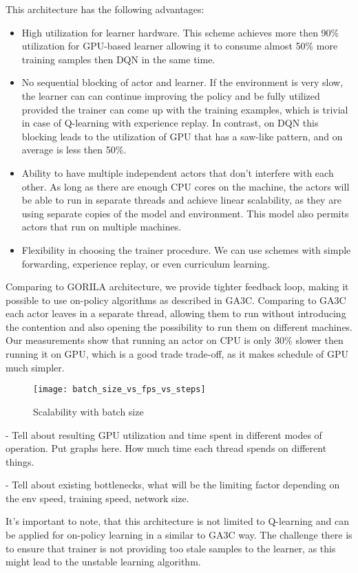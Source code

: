 This architecture has the following advantages:
\begin{itemize}
    \item High utilization for learner hardware. This scheme achieves more then 90\% utilization
        for GPU-based learner allowing it to consume almost 50\% more training samples then DQN in
        the same time.

    \item No sequential blocking of actor and learner. If the environment is very slow, the learner
        can can continue improving the policy and be fully utilized provided the trainer can come up
        with the training examples, which is trivial in case of Q-learning with experience replay.
        In contrast, on DQN this blocking leads to the utilization of GPU that has a saw-like
        pattern, and on average is less then 50\%.

    \item Ability to have multiple independent actors that don't interfere with each other. As long
        as there are enough CPU cores on the machine, the actors will be able to run in separate
        threads and achieve linear scalability, as they are using separate copies of the model and
        environment. This model also permits actors that run on multiple machines.

    \item Flexibility in choosing the trainer procedure. We can use schemes with simple forwarding,
        experience replay, or even curriculum learning.
\end{itemize}

Comparing to GORILA architecture, we provide tighter feedback loop, making it possible to use
on-policy algorithms as described in GA3C. Comparing to GA3C each actor leaves in a separate
thread, allowing them to run without introducing the contention and also opening the possibility
to run them on different machines. Our measurements show that running an actor on CPU is only 30\%
slower then running it on GPU, which is a good trade trade-off, as it makes schedule of GPU much
simpler.

\begin{figure}[h!]
\caption{Scalability with batch size}
\texttt{[image: batch\_size\_vs\_fps\_vs\_steps]}
\end{figure}

- Tell about resulting GPU utilization and time spent in different modes of operation.
Put graphs here. How much time each thread spends on different things.

- Tell about existing bottlenecks, what will be the limiting factor depending on the env speed,
training speed, network size.

It's important to note, that this architecture is not limited to Q-learning and can be applied
for on-policy learning in a similar to GA3C way. The challenge there is to ensure that trainer is
not providing too stale samples to the learner, as this might lead to the unstable learning
algorithm.
